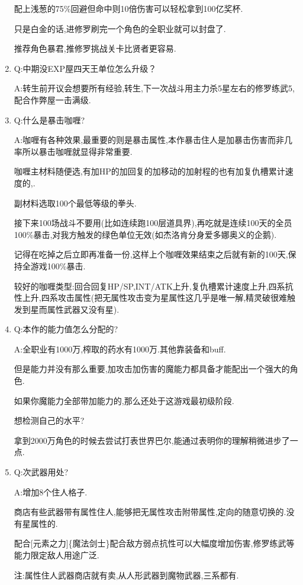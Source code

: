 \begin{enumerate}
	配上浅葱的75\%回避但命中则10倍伤害可以轻松拿到100亿奖杯.

	只是白金的话,进修罗刷完一个角色的全职业就可以封盘了.

	推荐角色暴君,推修罗挑战关卡比贤者更容易.

	\item
	Q:中期没EXP屋四天王单位怎么升级？

	A:转生前开议会想要所有经验,转生,下一次战斗用主力杀5星左右的修罗练武5,配合作弊屋一击满级.

	\item
	Q:什么是暴击咖喱?
	
	A:咖喱有各种效果,最重要的则是暴击属性,本作暴击住人是加暴击伤害而非几率所以暴击咖喱就显得非常重要.

	咖喱主材料随便选,有加HP的加回复的加移动的加射程的也有加复仇槽累计速度的,{\color{red}{也有开局自带异常状态的}}.

	副材料选取100个最低等级的拳头.

	接下来100场战斗不要用(比如连续跑100层道具界),再吃就是连续100天的全员100\%暴击,对我方触发的绿色单位无效(如杰洛肯分身爱多娜奥义的企鹅).

	记得在吃掉之后立即再准备一份,这样上个咖喱效果结束之后就有新的100天,保持全游戏100\%暴击.

	较好的咖喱类型:回合回复HP/SP,INT/ATK上升,复仇槽累计速度上升,四系抗性上升,四系攻击属性(把无属性攻击变为星属性这几乎是唯一解,精灵破很难触发到星而属性武器又没有星).

	\item
	Q:本作的能力值怎么分配的?

	A:全职业有1000万,榨取的药水有1000万.其他靠装备和buff.

	但是能力并没有那么重要,加攻击加伤害的魔能力都具备才能配出一个强大的角色.

	如果你魔能力全部带加能力的,那么还处于这游戏最初级阶段.

	想检测自己的水平?

	拿到2000万角色的时候去尝试打表世界巴尔,能通过表明你的理解稍微进步了一点.

	\item
	Q:次武器用处?

	A:增加8个住人格子.

	商店有些武器带有属性住人,能够把无属性攻击附带属性,定向的随意切换的{\color{red}{精灵破}}.没有星属性的.

	配合[元素之力]\{魔法剑士\}配合敌方弱点抗性可以大幅度增加伤害,修罗练武等能力限定敌人用途广泛.

	注:属性住人武器商店就有卖,从人形武器到魔物武器,三系都有.


\end{enumerate}
